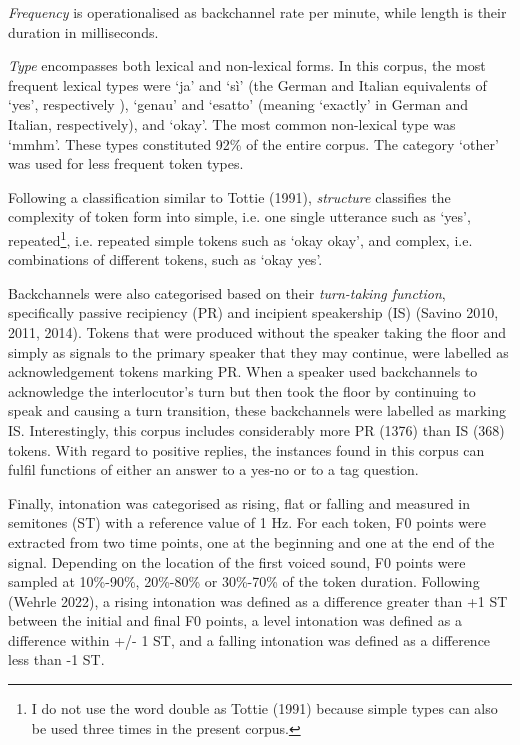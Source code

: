 \begin{styleStandard}
\textit{Frequency} is operationalised as backchannel rate per minute, while length is their duration in milliseconds.
\end{styleStandard}

\begin{styleStandard}
\textit{Type} encompasses both lexical and non-lexical forms. In this corpus, the most frequent lexical types were ‘ja’ and ‘sì’ (the German and Italian equivalents of ‘yes’, respectively ), ‘genau’ and ‘esatto’ (meaning ‘exactly’ in German and Italian, respectively), and ‘okay’. The most common non-lexical type was ‘mmhm’. These types constituted 92\% of the entire corpus. The category ‘other’ was used for less frequent token types.
\end{styleStandard}

\begin{styleStandard}
Following a classification similar to Tottie (1991), \textit{structure} classifies the complexity of token form into simple, i.e. one single utterance such as ‘yes’, repeated\footnote{I do not use the word double as Tottie (1991) because simple types can also be used three times in the present corpus.}, i.e. repeated simple tokens such as ‘okay okay’, and complex, i.e. combinations of different tokens, such as ‘okay yes’.
\end{styleStandard}

\begin{styleStandard}
Backchannels were also categorised based on their \textit{turn-taking function}, specifically passive recipiency (PR) and incipient speakership (IS) (Savino 2010, 2011, 2014). Tokens that were produced without the speaker taking the floor and simply as signals to the primary speaker that they may continue, were labelled as acknowledgement tokens marking PR. When a speaker used backchannels to acknowledge the interlocutor’s turn but then took the floor by continuing to speak and causing a turn transition, these backchannels were labelled as marking IS. Interestingly, this corpus includes considerably more PR (1376) than IS (368) tokens. With regard to positive replies, the instances found in this corpus can fulfil functions of either an answer to a yes-no or to a tag question.
\end{styleStandard}

\begin{styleStandard}
Finally, intonation was categorised as rising, flat or falling and measured in semitones (ST) with a reference value of 1 Hz. For each token, F0 points were extracted from two time points, one at the beginning and one at the end of the signal. Depending on the location of the first voiced sound, F0 points were sampled at 10\%-90\%, 20\%-80\% or 30\%-70\% of the token duration. Following (Wehrle 2022), a rising intonation was defined as a difference greater than +1 ST between the initial and final F0 points, a level intonation was defined as a difference within +/- 1 ST, and a falling intonation was defined as a difference less than -1 ST.
\end{styleStandard}

